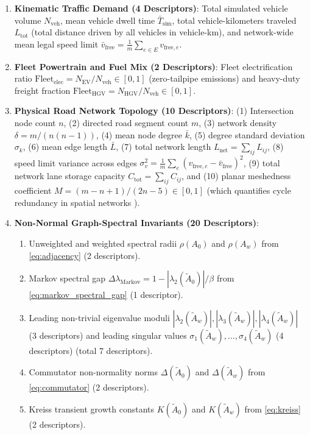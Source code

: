 \documentclass[journal]{IEEEtran}
\begin{document}
\begin{enumerate}
    \item \textbf{Kinematic Traffic Demand (4 Descriptors)}: Total simulated vehicle volume $N_{\text{veh}}$, mean vehicle dwell time $\bar{T}_{\text{sim}}$, total vehicle-kilometers traveled $L_{\text{tot}}$ (total distance driven by all vehicles in vehicle-km), and network-wide mean legal speed limit $\bar{v}_{\text{free}} = \frac{1}{m} \sum_{e \in E} v_{\text{free}, e}$.
    \item \textbf{Fleet Powertrain and Fuel Mix (2 Descriptors)}: Fleet electrification ratio $\text{Fleet}_{\text{elec}} = N_{\text{EV}} / N_{\text{veh}} \in [0, 1]$ (zero-tailpipe emissions) and heavy-duty freight fraction $\text{Fleet}_{\text{HGV}} = N_{\text{HGV}} / N_{\text{veh}} \in [0, 1]$.
    \item \textbf{Physical Road Network Topology (10 Descriptors)}: (1) Intersection node count $n$, (2) directed road segment count $m$, (3) network density $\delta = m / (n(n-1))$, (4) mean node degree $\bar{k}$, (5) degree standard deviation $\sigma_k$, (6) mean edge length $\bar{L}$, (7) total network length $L_{\text{net}} = \sum_{ij} L_{ij}$, (8) speed limit variance across edges $\sigma_v^2 = \frac{1}{m} \sum_{e} (v_{\text{free}, e} - \bar{v}_{\text{free}})^2$, (9) total network lane storage capacity $C_{\text{tot}} = \sum_{ij} C_{ij}$, and (10) planar meshedness coefficient $M = (m - n + 1) / (2n - 5) \in [0, 1]$ (which quantifies cycle redundancy in spatial networks \cite{Barthelemy2011}).
    \item \textbf{Non-Normal Graph-Spectral Invariants (20 Descriptors)}: 
    \begin{enumerate}
        \item Unweighted and weighted spectral radii $\rho(A_0)$ and $\rho(A_w)$ from \eqref{eq:adjacency} (2 descriptors).
        \item Markov spectral gap $\Delta\lambda_{\text{Markov}} = 1 - |\lambda_2(\tilde{A}_0)|/\beta$ from \eqref{eq:markov_spectral_gap} (1 descriptor).
        \item Leading non-trivial eigenvalue moduli $|\lambda_2(\tilde{A}_w)|, |\lambda_3(\tilde{A}_w)|, |\lambda_4(\tilde{A}_w)|$ (3 descriptors) and leading singular values $\sigma_1(\tilde{A}_w), \dots, \sigma_4(\tilde{A}_w)$ (4 descriptors) (total 7 descriptors).
        \item Commutator non-normality norms $\Delta(\tilde{A}_0)$ and $\Delta(\tilde{A}_w)$ from \eqref{eq:commutator} (2 descriptors).
        \item Kreiss transient growth constants $K(\tilde{A}_0)$ and $K(\tilde{A}_w)$ from \eqref{eq:kreiss} (2 descriptors).

\end{enumerate}
\end{enumerate}
\end{document}
